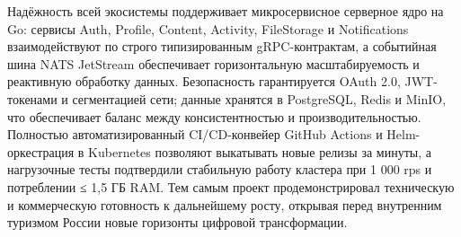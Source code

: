 Надёжность всей экосистемы поддерживает микросервисное серверное ядро на Go: сервисы Auth, Profile, Content, Activity, FileStorage и Notifications взаимодействуют по строго типизированным gRPC-контрактам, а событийная шина NATS JetStream обеспечивает горизонтальную масштабируемость и реактивную обработку данных. Безопасность гарантируется OAuth 2.0, JWT-токенами и сегментацией сети; данные хранятся в PostgreSQL, Redis и MinIO, что обеспечивает баланс между консистентностью и производительностью. Полностью автоматизированный CI/CD-конвейер GitHub Actions и Helm-оркестрация в Kubernetes позволяют выкатывать новые релизы за минуты, а нагрузочные тесты подтвердили стабильную работу кластера при 1 000 rps и потреблении ≤ 1,5 ГБ RAM. Тем самым проект продемонстрировал техническую и коммерческую готовность к дальнейшему росту, открывая перед внутренним туризмом России новые горизонты цифровой трансформации.